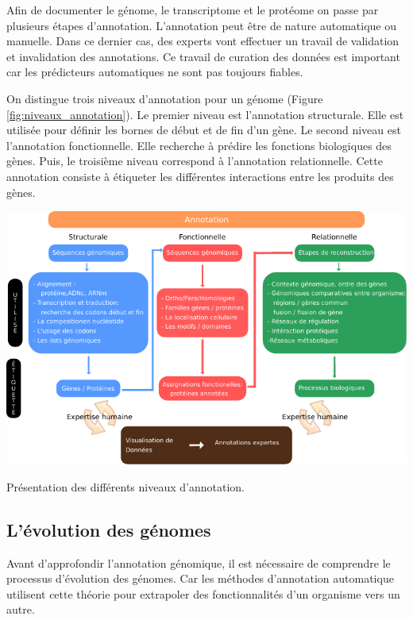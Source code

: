 \begin{refsection}
    Afin de documenter le génome, le transcriptome et le protéome on passe par plusieurs étapes d’annotation. L’annotation peut être de nature automatique ou manuelle. Dans ce dernier cas, des experts vont effectuer un travail de validation et invalidation des annotations. Ce travail de curation des données est important car les prédicteurs automatiques ne sont pas toujours fiables.
    
    On distingue trois niveaux d’annotation pour un génome (Figure \ref{fig:niveaux_annotation}). Le premier niveau est l’annotation structurale. Elle est utilisée pour définir les bornes de début et de fin d’un gène.  Le second niveau est l’annotation fonctionnelle. Elle recherche à prédire les fonctions biologiques des gènes. Puis, le troisième niveau correspond à l’annotation relationnelle. Cette annotation consiste à étiqueter les différentes interactions entre les produits des gènes.
    
    \begin{shadedfigure}
        \centering
        \includegraphics[width=\textwidth]{img/niveaux_annotations.pdf}
        \caption{Présentation des différents niveaux d’annotation.}
        \label{fig:niveaux_annotation}
    \end{shadedfigure}
    
    \subsection{L’évolution des génomes}
    Avant d'approfondir l’annotation génomique, il est nécessaire de comprendre le processus d’évolution des génomes. Car les méthodes d’annotation automatique utilisent cette théorie pour extrapoler des fonctionnalités d’un organisme vers un autre.
    

\end{refsection}
